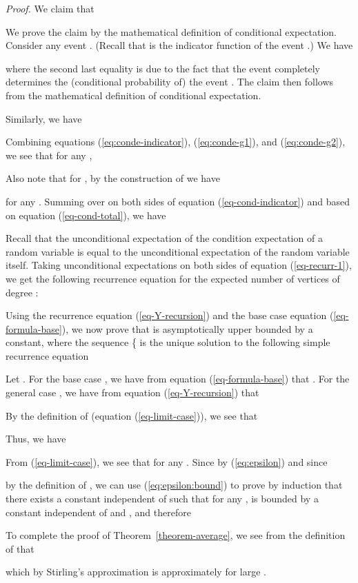 \documentclass[11pt]{article}
\newenvironment{proof}[0]{\textit{Proof.} }{\hfill   }
\begin{document}
\begin{proof}
We claim that 

We prove the claim by the mathematical definition of conditional expectation.
Consider any event .  
(Recall that  is the indicator function of the event
.) We have 

where the second last equality is due to the fact that the event 
 completely determines 
the (conditional probability of) the event .
The claim then follows from the mathematical definition of conditional expectation.

Similarly, we have

 
Combining equations (\ref{eq:conde-indicator}), (\ref{eq:conde-g1}),
and (\ref{eq:conde-g2}), we see that
for any ,

Also note that for , by the construction of  we have 
 
for any .
Summing over  on both sides of equation (\ref{eq-cond-indicator}) and based
on equation (\ref{eq-cond-total}), we have

Recall that the unconditional expectation of the condition expectation of a random variable
 is equal to the unconditional expectation of the random variable itself. 
Taking unconditional  expectations  on both sides of equation (\ref{eq-recurr-1}),
we get the following recurrence equation for the expected number of vertices of degree :

Using the recurrence equation (\ref{eq-Y-recursion}) and 
the base case equation (\ref{eq-formula-base}), we now prove
that 
 is asymptotically upper bounded by a constant, 
where the  sequence \{ is the
unique solution to the following simple recurrence equation      

Let . For the base case , we have from 
equation (\ref{eq-formula-base}) that .
For the general case , we have from equation (\ref{eq-Y-recursion}) that

By the definition of  (equation (\ref{eq-limit-case})), we see that

Thus, we have

From (\ref{eq-limit-case}), we see that  for any .
Since  by (\ref{eq:epsilon})  and since 

by the definition of  , we can use (\ref{eq:epsilon:bound}) to prove by induction
 that there exists a constant  independent of  such that for any ,
 is bounded by a constant  independent of  and , and therefore
 
To complete the proof of Theorem~\ref{theorem-average},
we see from the definition of  that

which by Stirling's approximation is
approximately   for large .
\end{proof}
\end{document}
